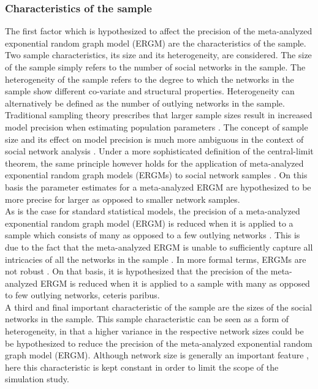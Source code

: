 \documentclass[a4paper, man]{apa6}
\begin{document}
\subsubsection{Characteristics of the sample} The first factor which is hypothesized to affect the precision of the meta-analyzed exponential random graph model (ERGM) are the characteristics of the sample. Two sample characteristics, its size and its heterogeneity, are considered. The size of the sample simply refers to the number of social networks in the sample. The heterogeneity of the sample refers to the degree to which the networks in the sample show different co-variate and structural properties. Heterogeneity can alternatively be defined as the number of outlying networks in the sample.
\\
Traditional sampling theory prescribes that larger sample sizes result in increased model precision when estimating population parameters \cite{lohr2009sampling}. The concept of sample size and its effect on model precision is much more ambiguous in the context of social network analysis \cite{kolaczyk2015question}. \clearpage \noindent Under a more sophisticated definition of the central-limit theorem, the same principle however holds for the application of meta-analyzed exponential random graph models (ERGMs) to social network samples \cite{kolaczyk2015question}. On this basis the parameter estimates for a meta-analyzed ERGM are hypothesized to be more precise for larger as opposed to smaller network samples. 
\\
As is the case for standard statistical models, the precision of a meta-analyzed exponential random graph model (ERGM) is reduced when it is applied to a sample which consists of many as opposed to a few outlying networks \cite{koskinen2018outliers}. This is due to the fact that the meta-analyzed ERGM is unable to sufficiently capture all intricacies of all the networks in the sample \cite{koskinen2018outliers}. In more formal terms, ERGMs are not robust \cite{rehnberg2016exponential}. On that basis, it is hypothesized that the precision of the meta-analyzed ERGM is reduced when it is applied to a sample with many as opposed to few outlying networks, ceteris paribus. 
\\
A third and final important characteristic of the sample are the sizes of the social networks in the sample. This sample characteristic can be seen as a form of heterogeneity, in that a higher variance in the respective network sizes could be be hypothesized to reduce the precision of the meta-analyzed exponential random graph model (ERGM). Although network size is generally an important feature \cite{kolaczyk2015question}, here this characteristic is kept constant in order to limit the scope of the simulation study. 
\\
\end{document}
